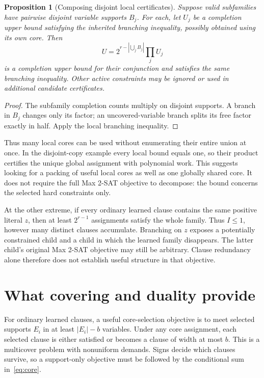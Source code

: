 \documentclass[11pt,a4paper]{article}
\newtheorem{proposition}[theorem]{Proposition}
\theoremstyle{definition}
\theoremstyle{remark}
\begin{document}
\begin{proposition}[Composing disjoint local certificates]
Suppose valid subfamilies have pairwise disjoint variable supports $B_j$.
For each, let $U_j$ be a completion upper bound satisfying the inherited
branching inequality, possibly obtained using its own core. Then
\[
 U=2^{r-|\bigcup_jB_j|}\prod_j U_j
\]
is a completion upper bound for their conjunction and satisfies the same
branching inequality. Other active constraints may be ignored or used in
additional candidate certificates.
\end{proposition}
\begin{proof}
The subfamily completion counts multiply on disjoint supports. A branch
in $B_j$ changes only its factor; an uncovered-variable branch splits its
free factor exactly in half. Apply the local branching inequality.
\end{proof}

Thus many local cores can be used without enumerating their entire union
at once. In the disjoint-copy example every local bound equals one, so
their product certifies the unique global assignment with polynomial work.
This suggests looking for a packing of useful local cores as well as one
globally shared core. It does not require the full Max 2-SAT objective to
decompose: the bound concerns the selected hard constraints only.

At the other extreme, if every ordinary learned clause contains the same
positive literal $z$, then at least $2^{r-1}$ assignments satisfy the whole
family. Thus $I\le1$, however many distinct clauses accumulate.
Branching on $z$ exposes a potentially constrained child and a child in
which the learned family disappears. The latter child's original Max
2-SAT objective may still be arbitrary. Clause redundancy alone therefore
does not establish useful structure in that objective.

\section{What covering and duality provide}

For ordinary learned clauses, a useful core-selection objective is to meet
selected supports $E_i$ in at least $|E_i|-b$ variables. Under any core
assignment, each selected clause is either satisfied or becomes a clause
of width at most $b$. This is a multicover problem with nonuniform demands.
Signs decide which clauses survive, so a support-only objective must be
followed by the conditional sum in~\eqref{eq:core}.
\end{document}
